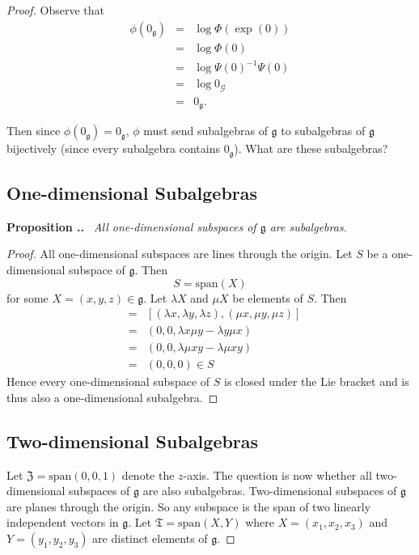 \documentclass[honours]{UNSWthesis}
\newcommand{\G}{\mathcal{G}}
\newcommand{\g}{\mathfrak{g}}
\newcommand{\1}{\mathbf{e}_{1}}
\newcommand{\2}{\mathbf{e}_{3}}
\newcommand{\3}{\mathbf{e}_{3}}
\newcounter{Item}[section]
\newenvironment{Proposition}{\medskip
                            \refstepcounter{Item}
                            \noindent
                           {\bf Proposition \thesection.\theItem.}\ %
                            \begingroup \sl}
                           {\endgroup\medskip}
\begin{document}
\begin{proof}
Observe that 
\begin{eqnarray*}
\phi(0_{\g})&=&\log \Phi (\exp(0)) \\
&=& \log \Phi(0) \\
&=& \log \Psi(0)^{-1}\Psi(0) \\
&=& \log 0_{\G} \\
&=& 0_{\g}.
\end{eqnarray*}

Then since $\phi(0_{\g})=0_{\g}$, $\phi$ must send subalgebras of $\g$ to subalgebras of $\g$ bijectively (since every subalgebra contains $0_{\g}$). What are these subalgebras?


\subsection{One-dimensional Subalgebras}
\begin{Proposition}
All one-dimensional subspaces of $\g$ are subalgebras.
\end{Proposition}

\begin{proof}
All one-dimensional subspaces are lines through the origin. Let $S$ be a one-dimensional subspace of $\g$. Then 
\[
S= \text{span}(X)
\]
for some $X=(x,y,z) \in \g$. Let $\lambda X$ and $\mu X$ be elements of $S$. Then 
\begin{eqnarray*}
[\lambda X,\mu X] &=& [(\lambda x, \lambda y, \lambda z), (\mu x, \mu y, \mu z)] \\
&=& (0,0, \lambda x \mu y - \lambda y \mu x) \\
&=& (0,0, \lambda  \mu xy - \lambda \mu xy) \\
&=& (0,0,0) \in S
\end{eqnarray*}
Hence every one-dimensional subspace of $S$ is closed under the Lie bracket and is thus also a one-dimensional subalgebra. 
\end{proof}

\subsection{Two-dimensional Subalgebras}
Let $\mathfrak{Z}=\text{span}(0,0,1)$ denote the $z$-axis.
The question is now whether all two-dimensional subspaces of $\g$ are also subalgebras. Two-dimensional subspaces of $\g$ are planes through the origin. So any subspace is the span of two linearly independent vectors in $\g$.
Let $\mathfrak{T}= \text{span}(X ,Y)$ where $X=(x_{1},x_{2},x_{3})$ and $Y=(y_{1},y_{2},y_{3})$ are distinct elements of $\g$.


\end{proof}
\end{document}
